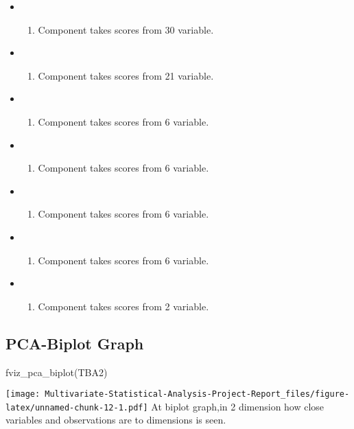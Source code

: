 \documentclass[12pt,twoside]{deuthesis}
\newenvironment{Shaded}{\begin{snugshade}}{\end{snugshade}}
\newcommand{\FunctionTok}[1]{\textcolor[rgb]{0.00,0.00,0.00}{#1}}
\newcommand{\NormalTok}[1]{#1}
\providecommand{\tightlist}{%
  \setlength{\itemsep}{0pt}\setlength{\parskip}{0pt}}
\begin{document}
\begin{itemize}
\item
  \begin{enumerate}
  \def\labelenumi{\arabic{enumi}.}
  \tightlist
  \item
    Component takes scores from 30 variable.
  \end{enumerate}
\item
  \begin{enumerate}
  \def\labelenumi{\arabic{enumi}.}
  \setcounter{enumi}{1}
  \tightlist
  \item
    Component takes scores from 21 variable.
  \end{enumerate}
\item
  \begin{enumerate}
  \def\labelenumi{\arabic{enumi}.}
  \setcounter{enumi}{2}
  \tightlist
  \item
    Component takes scores from 6 variable.
  \end{enumerate}
\item
  \begin{enumerate}
  \def\labelenumi{\arabic{enumi}.}
  \setcounter{enumi}{3}
  \tightlist
  \item
    Component takes scores from 6 variable.
  \end{enumerate}
\item
  \begin{enumerate}
  \def\labelenumi{\arabic{enumi}.}
  \setcounter{enumi}{4}
  \tightlist
  \item
    Component takes scores from 6 variable.
  \end{enumerate}
\item
  \begin{enumerate}
  \def\labelenumi{\arabic{enumi}.}
  \setcounter{enumi}{5}
  \tightlist
  \item
    Component takes scores from 6 variable.
  \end{enumerate}
\item
  \begin{enumerate}
  \def\labelenumi{\arabic{enumi}.}
  \setcounter{enumi}{6}
  \tightlist
  \item
    Component takes scores from 2 variable.
  \end{enumerate}
\end{itemize}
\hypertarget{pca-biplot-graph}{%
\subsection{PCA-Biplot Graph}\label{pca-biplot-graph}}
\begin{Shaded}
\begin{Highlighting}[]
\FunctionTok{fviz\_pca\_biplot}\NormalTok{(TBA2)}
\end{Highlighting}
\end{Shaded}
\texttt{[image: Multivariate-Statistical-Analysis-Project-Report\_files/figure-latex/unnamed-chunk-12-1.pdf]}
At biplot graph,in 2 dimension how close variables and observations are to dimensions is seen.
\end{document}
